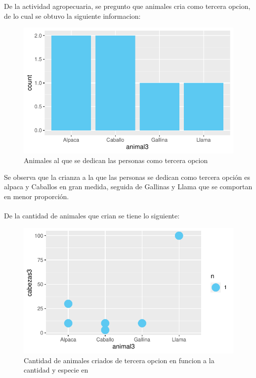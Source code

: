 \documentclass[12pt]{article}\usepackage[]{graphicx}\usepackage[]{xcolor}
\makeatletter
\def\maxwidth{ %
  \ifdim\Gin@nat@width>\linewidth
    \linewidth
  \else
    \Gin@nat@width
  \fi
}
\newenvironment{knitrout}{}{} %
\makeatother
\begin{document}
	De la actividad agropecuaria, se pregunto que animales cria como tercera opcion, de lo cual se obtuvo la siguiente informacion:
	\begin{figure}[H]
	\centering
\begin{knitrout}
\color{fgcolor}
\includegraphics[width=\maxwidth]{figure/twenty_one-1} 
\end{knitrout}
	\caption{Animales al que se dedican las personas como tercera opcion}
	\end{figure}
	Se observa que la crianza a la que las personas se dedican como tercera opción es alpaca y Caballos en gran medida, seguida de Gallinas y Llama que se comportan en menor proporción.\\
	\\
	De la cantidad de animales que crian se tiene lo siguiente:
	\begin{figure}[H]
	\centering
\begin{knitrout}
\color{fgcolor}
\includegraphics[width=\maxwidth]{figure/twenty_two-1} 
\end{knitrout}
	\caption{Cantidad de animales criados de tercera opcion en funcion a la cantidad y especie en \comunidad}
	\end{figure}
\end{document}
